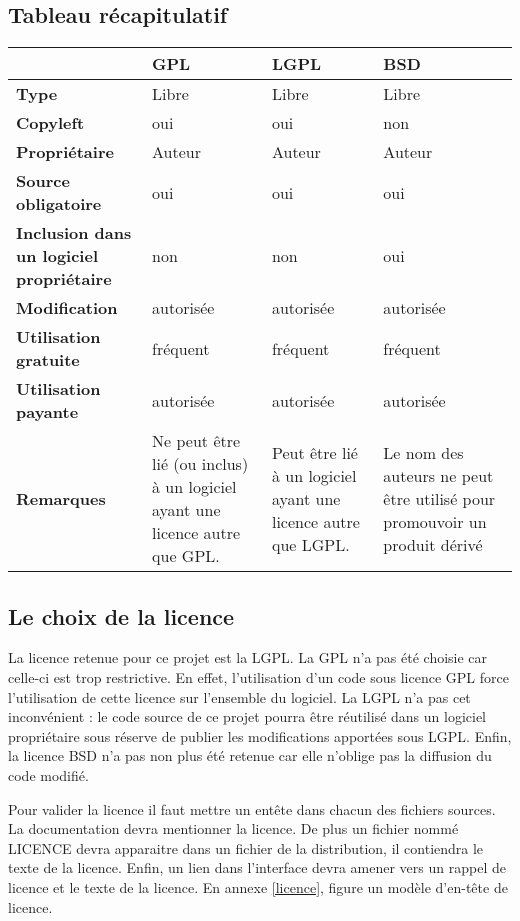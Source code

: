 	\subsection{Tableau récapitulatif}
		\begin{tabular}{|p{3cm}|p{3cm}|p{3cm}|p{3cm}|}
			\hline                 
			& \textbf{GPL} & \textbf{LGPL} & \textbf{BSD} \\              
			\hline                 
			\textbf{Type} & Libre & Libre & Libre \\
			\hline                 
			\textbf{Copyleft} & oui & oui & non \\
			\hline                 
			\textbf{Propriétaire} & Auteur & Auteur & Auteur \\
			\hline                 
			\textbf{Source obligatoire} & oui & oui & oui \\
			\hline                 
			\textbf{Inclusion dans un logiciel propriétaire} & non & non & oui \\
			\hline                 
			\textbf{Modification} & autorisée & autorisée & autorisée \\
			\hline                 
			\textbf{Utilisation gratuite} & fréquent & fréquent & fréquent \\
			\hline                 
			\textbf{Utilisation payante} & autorisée & autorisée & autorisée \\
			\hline                 
			\textbf{Remarques} & Ne peut être lié (ou inclus) à un logiciel ayant une licence autre que GPL. & Peut être lié à un logiciel ayant une licence autre que LGPL. & Le nom des auteurs ne peut être utilisé pour promouvoir un produit dérivé \\
			\hline  
		\end{tabular}


	\subsection{Le choix de la licence}
		La licence retenue pour ce projet est la LGPL. La GPL n'a pas été choisie car celle-ci est trop restrictive. En effet, l'utilisation d'un code sous licence GPL force l'utilisation de cette licence sur l'ensemble du logiciel. La LGPL n'a pas cet inconvénient : le code source de ce projet pourra être réutilisé dans un logiciel propriétaire sous réserve de publier les modifications apportées sous LGPL. Enfin, la licence BSD n'a pas non plus été retenue car elle n'oblige pas la diffusion du code modifié.

		Pour valider la licence il faut mettre un entête dans chacun des fichiers sources. La documentation devra mentionner la licence. De plus un fichier nommé LICENCE devra apparaitre dans un fichier de la distribution, il contiendra le texte de la licence. Enfin, un lien dans l'interface devra amener vers un rappel de licence et le texte de la licence. En annexe \ref{licence}, figure un modèle d'en-tête de licence.